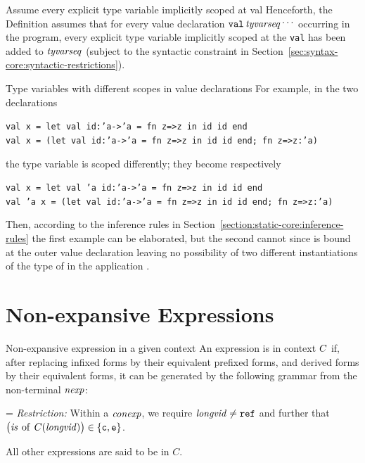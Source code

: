 \begin{clause}{Assume every explicit type variable implicitly scoped at val}
Henceforth, the Definition assumes that for every
value declaration $\hbox{\tt val}\,\textit{tyvarseq\/}\mathinner{{}^{\textstyle .\,.\,.}}$ occurring in the
program, every explicit type variable implicitly scoped at the {\tt val}
has been added to $\textit{tyvarseq\/}$ (subject to the syntactic constraint in Section~\ref{sec:syntax-core:syntactic-restrictions}).
\end{clause}

\begin{example}{Type variables with different scopes in value declarations}
For example, in the two declarations
\begin{tabbing}
\indent\=\tt  val x =  let val id:'a->'a = fn z=>z in id id end\\
       \>\tt  val x = (let val id:'a->'a = fn z=>z in id id end; fn z=>z:'a)
\end{tabbing}
the type variable  is scoped differently; they become respectively
\begin{tabbing}
\indent\=\tt val x =  let val 'a id:'a->'a = fn z=>z in id id end\\
       \>\tt val 'a x = (let val id:'a->'a = fn z=>z in id id end; fn z=>z:'a)
\end{tabbing}
Then, according to the inference rules in
Section~\ref{section:static-core:inference-rules}
the first example can be elaborated, but the second cannot since 
is bound at the outer value declaration leaving no possibility of two 
different instantiations of the type of  in the application
.
\end{example}

\section{Non-expansive Expressions}

\begin{definition}{Non-expansive expression in a given context}
An expression is  in context $C$ if, after
replacing infixed forms by their equivalent prefixed forms, and derived
forms by their equivalent forms, it can be generated by the following
grammar from the non-terminal $\textit{nexp\/}$:
\medskip


\hangindent=\parindent{}\noindent
{\sl Restriction:}\/ Within a $\textit{conexp\/}$, we require $\textit{longvid\/}\neq\mbox{\tt ref}$ and
further that $\bigl(\textit{is\/}\, \mathbin{\rm of} \,C(\textit{longvid\/})\bigr)\in\{\hbox{\tt c},\hbox{\tt e}\}$.\medskip

\noindent All other expressions are said to be  in $C$.
\end{definition}

